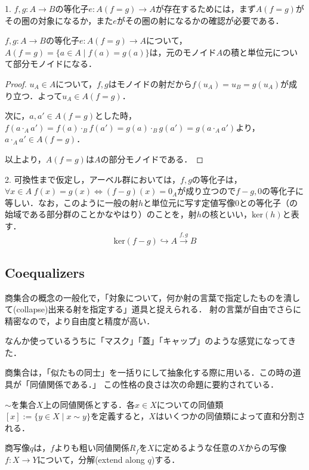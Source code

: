 \documentclass[uplatex, dvipdfmx]{jsarticle}
\begin{document}
\begin{example}
    1. $f,g:A\to B$の等化子$e:A(f=g)\to A$が存在するためには，まず$A(f=g)$がその圏の対象になるか，また$e$がその圏の射になるかの確認が必要である．

    \begin{proposition*}[Monでの等化子]
        $f,g:A\to B$の等化子$e:A(f=g)\to A$について，$A(f=g)=\{ a\in A\mid f(a)=g(a) \}$は，元のモノイド$A$の積と単位元について部分モノイドになる．
    \end{proposition*}
    \begin{proof}
        $u_A\in A$について，$f,g$はモノイドの射だから$f(u_A)=u_B=g(u_A)$が成り立つ．よって$u_A\in A(f=g)$．
        
        次に，$a,a'\in A(f=g)$とした時，$f(a\cdot_A a')=f(a)\cdot_B f(a')=g(a)\cdot_B g(a')=g(a\cdot_A a')$より，$a\cdot_Aa'\in A(f=g)$．

        以上より，$A(f=g)$は$A$の部分モノイドである．
    \end{proof}

    2. 可換性まで仮定し，アーベル群においては，$f,g$の等化子は，$\forall x\in A\; f(x)=g(x)\Leftrightarrow (f-g)(x)=0_A$が成り立つので$f-g,0$の等化子に等しい．なお，このように一般の射$h$と単位元に写す定値写像$0$との等化子（の始域である部分群のことかなやはり）のことを，射$h$の核といい，$\mathrm{ker}(h)$と表す．
    \[ \mathrm{ker}(f-g) \hookrightarrow A \xrightarrow{f,g} B \]
\end{example}

\subsection{Coequalizers}
商集合の概念の一般化で，「対象について，何か射の言葉で指定したものを潰して(collapse)出来る射を指定する」道具と捉えられる．
射の言葉が自由でさらに精密なので，より自由度と精度が高い．

なんか使っているうちに「マスク」「蓋」「キャップ」のような感覚になってきた．

商集合は，「似たもの同士」を一括りにして抽象化する際に用いる．この時の道具が「同値関係である．」
この性格の良さは次の命題に要約されている．
\begin{proposition*}
    $\sim$を集合$X$上の同値関係とする．各$x\in X$についての同値類$[x]:=\{ y\in X\mid x\sim y \}$を定義すると，$X$はいくつかの同値類によって直和分割される．
\end{proposition*}
\begin{remark*}商写像$q$は，$f$よりも粗い同値関係$R_f$を$X$に定めるような任意の$X$からの写像$f:X\to Y$について，分解(extend along $q$)する．
    \begin{center}
    \end{center}
\end{remark*}
\end{document}
